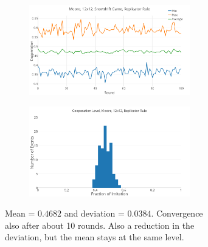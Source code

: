\documentclass[a4paper, 11pt]{article}
\begin{document}
\begin{figure}[H]
\begin{subfigure}{.55\textwidth}
	\begin{subfigure}{1\textwidth}
		\includegraphics[width=1\linewidth]{SDMoore12x12}
	\end{subfigure}

	\begin{subfigure}{1\textwidth}
		\includegraphics[width=1\linewidth]{SDMoore12x12HG}
	\end{subfigure}
\end{subfigure}%
\begin{subfigure}{.45\textwidth}
	Mean = $0.4682$ and deviation = $0.0384$. Convergence also after about 10 rounds. Also a reduction in the deviation, but the mean stays at the same level.
\end{subfigure}

\end{figure}




\newpage
\end{document}
